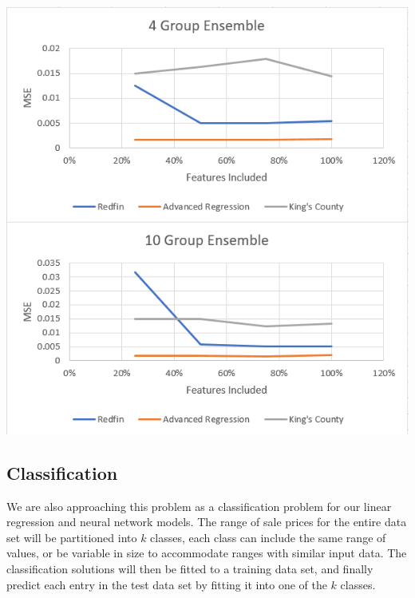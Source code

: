 \documentclass[10pt]{article}
\begin{document}
\begin{multicols}{2}
		\begin{center}
                  \captionsetup{type=figure}
			\includegraphics[scale=0.6]{Images/LineEnsembleResults} \\
			\label{fig:linr_ensemble}
		\end{center}
		\par
 		\subsection{Classification}
			We are also approaching this problem as a classification problem for our linear regression and neural network models. The range of sale prices for the entire data set will be partitioned into \(k\) classes, each class can include the same range of values, or be variable in size to accommodate ranges with similar input data. The classification solutions will then be fitted to a training data set, and finally predict each entry in the test data set by fitting it into one of the \(k\) classes.

\end{multicols}
\end{document}
